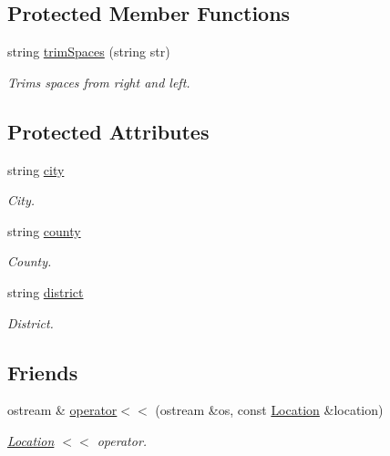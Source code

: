 \subsection*{Protected Member Functions}
\begin{DoxyCompactItemize}
\item 
string \hyperlink{class_location_a0b4be23bfc6e2ea1ed95d80f70a84fbf}{trim\+Spaces} (string str)
\begin{DoxyCompactList}\small\item\em Trims spaces from right and left. \end{DoxyCompactList}\end{DoxyCompactItemize}
\subsection*{Protected Attributes}
\begin{DoxyCompactItemize}
\item 
\hypertarget{class_location_a0179634b6ba4046f74f57949e789abfb}{}string \hyperlink{class_location_a0179634b6ba4046f74f57949e789abfb}{city}\label{class_location_a0179634b6ba4046f74f57949e789abfb}

\begin{DoxyCompactList}\small\item\em City. \end{DoxyCompactList}\item 
\hypertarget{class_location_a648dadbf656ddaff096a36faa271a165}{}string \hyperlink{class_location_a648dadbf656ddaff096a36faa271a165}{county}\label{class_location_a648dadbf656ddaff096a36faa271a165}

\begin{DoxyCompactList}\small\item\em County. \end{DoxyCompactList}\item 
\hypertarget{class_location_a3739b4e334dfd90923671fb543baef4a}{}string \hyperlink{class_location_a3739b4e334dfd90923671fb543baef4a}{district}\label{class_location_a3739b4e334dfd90923671fb543baef4a}

\begin{DoxyCompactList}\small\item\em District. \end{DoxyCompactList}\end{DoxyCompactItemize}
\subsection*{Friends}
\begin{DoxyCompactItemize}
\item 
ostream \& \hyperlink{class_location_acbdedd349c06b3c398317f9a9a9d3fe8}{operator$<$$<$} (ostream \&os, const \hyperlink{class_location}{Location} \&location)
\begin{DoxyCompactList}\small\item\em \hyperlink{class_location}{Location} $<$$<$ operator. \end{DoxyCompactList}\end{DoxyCompactItemize}


